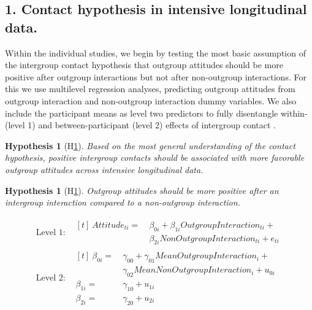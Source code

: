 \documentclass[man, 12pt, a4paper, mask]{apa7}
\theoremstyle{break}
\theoremstyle{plain}
\newtheorem{hyp}{Hypothesis}
\newtheorem{subhyp}{Hypothesis}
\begin{document}
\subsection{1. Contact hypothesis in intensive longitudinal data.} 
Within the individual studies, we begin by testing the most basic assumption of the intergroup contact hypothesis that outgroup attitudes should be more positive after outgroup interactions but not after non-outgroup interactions. For this we use multilevel regression analyses, predicting outgroup attitudes from outgroup interaction and non-outgroup interaction dummy variables. We also include the participant means as level two predictors to fully disentangle within- (level 1) and between-participant (level 2) effects of intergroup contact \citep[e.g.,][Section 4.6]{snijders2012}.

\begin{mdframed}[style=mdfhypothesis]
    \begin{hyp}[H\ref{hyp:contactHyp}] \label{hyp:contactHyp}
        Based on the most general understanding of the contact hypothesis, positive intergroup contacts should be associated with more favorable outgroup attitudes across intensive longitudinal data.
    \end{hyp}
    
    \begin{subhyp}[H\ref{hyp:contactDummyML}] \label{hyp:contactDummyML}
    \addtolength{\leftskip}{\subhypskip}
    Outgroup attitudes should be more positive after an intergroup interaction compared to a non-outgroup interaction.
    \end{subhyp}

    \begin{fleqn}[\eqskip] 
    \begin{equation} \label{eq:ContactDummy}
      \begin{split}
        \textrm{Level 1:} &
          \begin{aligned}[t]
            \ Attitude_{ti} =  &\ \beta_{0i} + \beta_{1i}OutgroupInteraction_{ti} + \\
                               &\ \beta_{2i}NonOutgroupInteraction_{ti} + e_{ti}
          \end{aligned} \\
        \textrm{Level 2:} &
            \begin{aligned}[t]
                \ \beta_{0i} = &\ \gamma_{00} + \gamma_{01}MeanOutgroupInteraction_{i} + \\
                               &\ \gamma_{02}MeanNonOutgroupInteraction_{i} + u_{0i} \\
                  \beta_{1i} = &\ \gamma_{10} + u_{1i} \\
                  \beta_{2i} = &\ \gamma_{20} + u_{2i}
            \end{aligned}
      \end{split} 
    \end{equation}
    \end{fleqn}
\end{mdframed}
\end{document}
